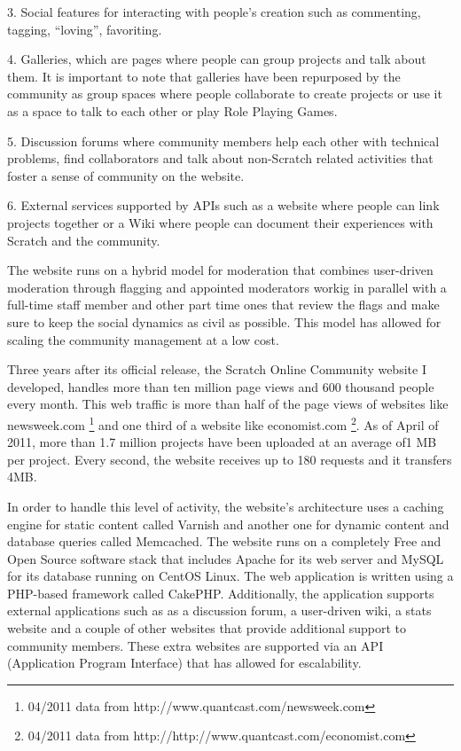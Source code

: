 3. Social features for interacting with people's creation such as commenting, tagging, ``loving'', favoriting.

4. Galleries, which are pages where people can group projects and talk about them. It is important to note that galleries have been repurposed by the community as group spaces where people collaborate to create projects or use it as a space to talk to each other or play Role Playing Games.

5. Discussion forums where community members help each other with technical problems, find collaborators and talk about non-Scratch related activities that foster a sense of community on the website.

6. External services supported by APIs such as a website where people can link projects together or a Wiki where people can document their experiences with Scratch and the community.

The website runs on a hybrid model for moderation that combines user-driven moderation through flagging and appointed moderators workig in parallel with a full-time staff member and other part time ones that review the flags and make sure to keep the social dynamics as civil as possible. 
This model has allowed for scaling the community management at a low cost.

Three years after its official release, the Scratch Online Community website I developed, handles more than ten million page views and 600 thousand people every month.
This web traffic is more than half of the page views of websites like newsweek.com \footnote{04/2011 data from http://www.quantcast.com/newsweek.com} and one third of a website like economist.com \footnote{04/2011 data from http://http://www.quantcast.com/economist.com}.
As of April of 2011, more than 1.7 million projects have been uploaded at an average of1 MB per project. 
Every second, the website receives up to 180 requests and it transfers 4MB.

In order to handle this level of activity, the website's architecture uses a caching engine for static content called Varnish and another one for dynamic content and database queries called Memcached. 
The website runs on a completely Free and Open Source software stack that includes Apache for its web server and MySQL for its database running on CentOS Linux. 
The web application is written using a PHP-based framework called CakePHP.
Additionally, the application supports external applications such as as a discussion forum, a user-driven wiki, a stats website and a couple of other websites that provide additional support to community members. 
These extra websites are supported via an API (Application Program Interface) that has allowed for escalability.

